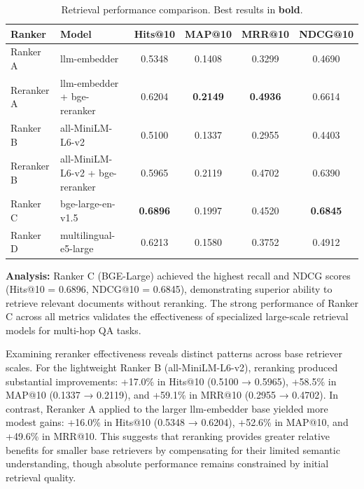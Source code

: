 \documentclass[10pt,twocolumn]{article}
\begin{document}
\begin{table}[t]
    \centering
    \caption{Retrieval performance comparison. Best results in \textbf{bold}.}
    \label{tab:retrieval_results}
    \footnotesize
    \setlength{\tabcolsep}{1.6em}
    \begin{tabular}{llcccc}
        \toprule
        \textbf{Ranker} & \textbf{Model}                  & \textbf{Hits@10} & \textbf{MAP@10} & \textbf{MRR@10} & \textbf{NDCG@10} \\
        \midrule
        Ranker A        & llm-embedder                    & 0.5348           & 0.1408          & 0.3299          & 0.4690           \\
        Reranker A      & llm-embedder + bge-reranker     & 0.6204           & \textbf{0.2149} & \textbf{0.4936} & 0.6614           \\
        \midrule
        Ranker B        & all-MiniLM-L6-v2                & 0.5100           & 0.1337          & 0.2955          & 0.4403           \\
        Reranker B      & all-MiniLM-L6-v2 + bge-reranker & 0.5965           & 0.2119          & 0.4702          & 0.6390           \\
        \midrule
        Ranker C        & bge-large-en-v1.5               & \textbf{0.6896}  & 0.1997          & 0.4520          & \textbf{0.6845}  \\
        \midrule
        Ranker D        & multilingual-e5-large           & 0.6213           & 0.1580          & 0.3752          & 0.4912           \\
        \bottomrule
    \end{tabular}
\end{table}

\textbf{Analysis:} Ranker C (BGE-Large) achieved the highest recall and NDCG scores (Hits@10 = 0.6896, NDCG@10 = 0.6845), demonstrating superior ability to retrieve relevant documents without reranking. The strong performance of Ranker C across all metrics validates the effectiveness of specialized large-scale retrieval models for multi-hop QA tasks.

Examining reranker effectiveness reveals distinct patterns across base retriever scales. For the lightweight Ranker B (all-MiniLM-L6-v2), reranking produced substantial improvements: +17.0\% in Hits@10 (0.5100 → 0.5965), +58.5\% in MAP@10 (0.1337 → 0.2119), and +59.1\% in MRR@10 (0.2955 → 0.4702). In contrast, Reranker A applied to the larger llm-embedder base yielded more modest gains: +16.0\% in Hits@10 (0.5348 → 0.6204), +52.6\% in MAP@10, and +49.6\% in MRR@10. This suggests that reranking provides greater relative benefits for smaller base retrievers by compensating for their limited semantic understanding, though absolute performance remains constrained by initial retrieval quality.
\end{document}
